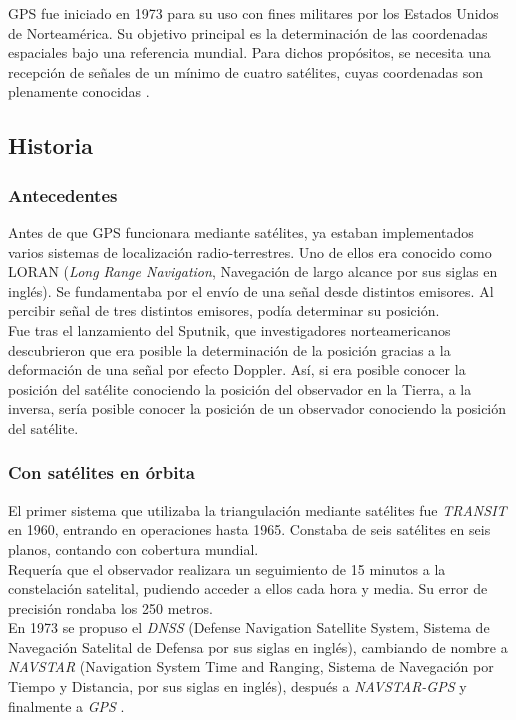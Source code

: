 GPS fue iniciado en 1973 para su uso con fines militares por los Estados Unidos de Norteamérica. Su objetivo principal es la determinación de las coordenadas espaciales bajo una referencia mundial. Para dichos propósitos, se necesita una recepción de señales de un mínimo de cuatro satélites, cuyas coordenadas son plenamente conocidas \cite{huerta2005gps}.

\subsection{Historia}

\subsubsection{Antecedentes}
Antes de que GPS funcionara mediante satélites, ya estaban implementados varios sistemas de localización radio-terrestres. Uno de ellos era conocido como LORAN (\textit{Long Range Navigation}, Navegación de largo alcance por sus siglas en inglés). Se fundamentaba por el envío de una señal desde distintos emisores. Al percibir señal de tres distintos emisores, podía determinar su posición. \\

Fue tras el lanzamiento del Sputnik\footnotemark, que investigadores norteamericanos descubrieron que era posible la determinación de la posición gracias a la deformación de una señal por efecto Doppler. Así, si era posible conocer la posición del satélite conociendo la posición del observador en la Tierra, a la inversa, sería posible conocer la posición de un observador conociendo la posición del satélite.


\subsubsection{Con satélites en órbita}
El primer sistema que utilizaba la triangulación mediante satélites fue \textit{TRANSIT} en 1960, entrando en operaciones hasta 1965. Constaba de seis satélites en seis planos, contando con cobertura mundial. \\

Requería que el observador realizara un seguimiento de 15 minutos a la constelación satelital, pudiendo acceder a ellos cada hora y media. Su error de precisión rondaba los 250 metros.\\

En 1973 se propuso el \textit{DNSS} (Defense Navigation Satellite System, Sistema de Navegación Satelital de Defensa por sus siglas en inglés), cambiando de nombre a \textit{NAVSTAR} (Navigation System Time and Ranging, Sistema de Navegación por Tiempo y Distancia, por sus siglas en inglés), después a \textit{NAVSTAR-GPS} y finalmente a \textit{GPS} \cite{termal2014prototipo}.

